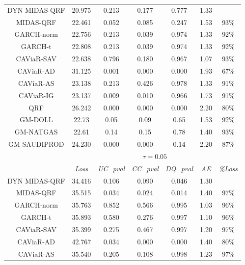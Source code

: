 \begin{table}[H]
\begin{tabular}{ccccccc}
\rowcolor[HTML]{D9D9D9} 
DYN MIDAS-QRF                        & 20.975 & 0.213    & 0.177    & 0.777    & 1.33 &        \\
\rowcolor[HTML]{D9D9D9} 
MIDAS-QRF                            & 22.461 & 0.052    & 0.085    & 0.247    & 1.53 & 93\%   \\
\rowcolor[HTML]{D9D9D9} GARCH-norm                     & 22.756 & 0.213    & 0.039    & 0.974    & 1.33 & 92\%   \\
\rowcolor[HTML]{D9D9D9} GARCH-t                        & 22.808 & 0.213    & 0.039    & 0.974    & 1.33 & 92\%   \\
\rowcolor[HTML]{D9D9D9} 
CAViaR-SAV                     & 22.638 & 0.796    & 0.180    & 0.967    & 1.07 & 93\%   \\
CAViaR-AD                      & 31.125 & 0.001    & 0.000    & 0.000    & 1.93 & 67\%   \\
\rowcolor[HTML]{D9D9D9} 
CAViaR-AS                      & 23.138 & 0.213    & 0.426    & 0.978    & 1.33 & 91\%   \\

CAViaR-IG                      & 23.137 & 0.009    & 0.010    & 0.966    & 1.73 & 91\%   \\
QRF                            & 26.242 & 0.000    & 0.000    & 0.000    & 2.20 & 80\%   \\
\rowcolor[HTML]{D9D9D9} 
GM-DOLL                        & 22.73  & 0.05     & 0.09     & 0.65     & 1.53 & 92\%   \\
\rowcolor[HTML]{D9D9D9} 
GM-NATGAS                      & 22.61  & 0.14     & 0.15     & 0.78     & 1.40 & 93\%   \\
GM-SAUDIPROD                  & 24.230 & 0.000    & 0.000    & 0.14     & 2.20 & 87\%   \\ \hline
                               & \multicolumn{6}{c}{$\tau=0.05$}                         \\ \hline
                               & \textit{Loss}   & \textit{UC\_pval} & \textit{CC\_pval} & \textit{DQ\_pval }& \textit{AE }  & \textit{\%Loss}\\ \hline
\rowcolor[HTML]{D9D9D9} 
DYN MIDAS-QRF                        & 34.416 & 0.106    & 0.090    & 0.046    & 1.30 &        \\
\rowcolor[HTML]{D9D9D9} 
MIDAS-QRF                            & 35.515 & 0.034    & 0.024    & 0.014    & 1.40 & 97\%   \\
\rowcolor[HTML]{D9D9D9} 
GARCH-norm                     & 35.763 & 0.852    & 0.566    & 0.995    & 1.03 & 96\%   \\
\rowcolor[HTML]{D9D9D9} 
GARCH-t                        & 35.893 & 0.580    & 0.276    & 0.997    & 1.10 & 96\%   \\
\rowcolor[HTML]{D9D9D9} 
CAViaR-SAV                     & 35.399 & 0.275    & 0.467    & 0.997    & 1.20 & 97\%   \\
CAViaR-AD                      & 42.767 & 0.034    & 0.000    & 0.000    & 1.40 & 80\%   \\
\rowcolor[HTML]{D9D9D9} 
CAViaR-AS                      & 35.540 & 0.205    & 0.108    & 0.998    & 1.23 & 97\%   \\


\end{tabular}
\end{table}
